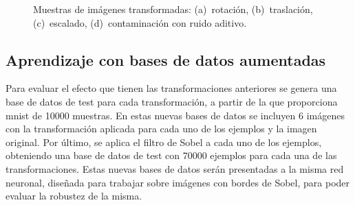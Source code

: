 \begin{figure}[H]
	\centering
	 \hspace{10pt}
	 \hspace{10pt}
	 \hspace{10pt}
	\caption{Muestras de imágenes transformadas: (a)~rotación, (b)~traslación, (c)~escalado, (d)~contaminación con ruido aditivo.}
	\label{fig.transformaciones}
\end{figure}

\subsection{Aprendizaje con bases de datos aumentadas} \label{sec.transformaciones}
Para evaluar el efecto que tienen las transformaciones anteriores se genera una base de datos de test para cada transformación, a partir de la que proporciona \acrshort{mnist} de 10000 muestras. En estas nuevas bases de datos se incluyen 6 imágenes con la transformación aplicada para cada uno de los ejemplos y la imagen original. Por último, se aplica el filtro de Sobel a cada uno de los ejemplos, obteniendo una base de datos de test con 70000 ejemplos para cada una de las transformaciones. Estas nuevas bases de datos serán presentadas a la misma red neuronal, diseñada para trabajar sobre imágenes con bordes de Sobel, para poder evaluar la robustez de la misma.\\

